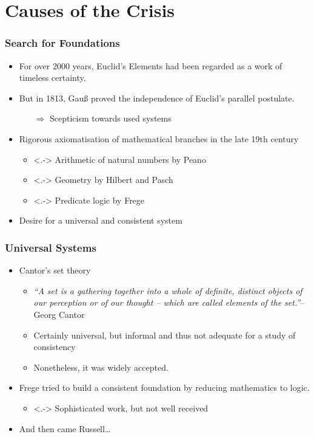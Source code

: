 \documentclass{beamer}
\begin{document}
\section{Causes of the Crisis}
\begin{frame}
    \frametitle{Search for Foundations}
    \begin{itemize}[<+->]
	\item For over 2000 years, Euclid's Elements had been regarded as a work of timeless certainty.
	\item But in 1813, Gauß proved the independence of Euclid's parallel postulate.
	\begin{itemize}
		\item[$\Rightarrow$] Scepticism towards used systems
	\end{itemize}
	\item Rigorous axiomatisation of mathematical branches in the late 19th century
	\begin{itemize}
		\item<.-> Arithmetic of natural numbers by Peano
		\item<.-> Geometry by Hilbert and Pasch
		\item<.-> Predicate logic by Frege
	\end{itemize}
	\item Desire for a universal and consistent system
    \end{itemize}
\end{frame}
\begin{frame}
    \frametitle{Universal Systems}
    \begin{itemize}[<+->]
	\item Cantor's set theory
	\begin{itemize}
		\item \textit{``A set is a gathering together into a whole of definite, distinct objects of our perception or of our thought -- which are called elements of the set.''}\nocite{cantor_set}\hfill-- Georg Cantor
		\item Certainly universal, but informal and thus not adequate for a study of consistency
		\item Nonetheless, it was widely accepted.
	\end{itemize}
	\item Frege tried to build a consistent foundation by reducing mathematics to logic.
	\begin{itemize}
		\item<.-> Sophisticated work, but not well received
	\end{itemize}
	\item And then came Russell\ldots
    \end{itemize}
\end{frame}
\end{document}
